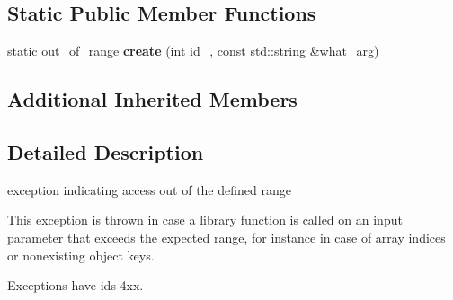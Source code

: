 \subsection*{Static Public Member Functions}
\begin{DoxyCompactItemize}
\item 
static \hyperlink{classnlohmann_1_1detail_1_1out__of__range}{out\+\_\+of\+\_\+range} {\bfseries create} (int id\+\_\+, const \hyperlink{namespacenlohmann_1_1detail_a1ed8fc6239da25abcaf681d30ace4985ab45cffe084dd3d20d928bee85e7b0f21}{std\+::string} \&what\+\_\+arg)\hypertarget{classnlohmann_1_1detail_1_1out__of__range_a3f6d82a6f967c4728a1ec735a7867073}{}\label{classnlohmann_1_1detail_1_1out__of__range_a3f6d82a6f967c4728a1ec735a7867073}

\end{DoxyCompactItemize}
\subsection*{Additional Inherited Members}


\subsection{Detailed Description}
exception indicating access out of the defined range 

This exception is thrown in case a library function is called on an input parameter that exceeds the expected range, for instance in case of array indices or nonexisting object keys.

Exceptions have ids 4xx.

